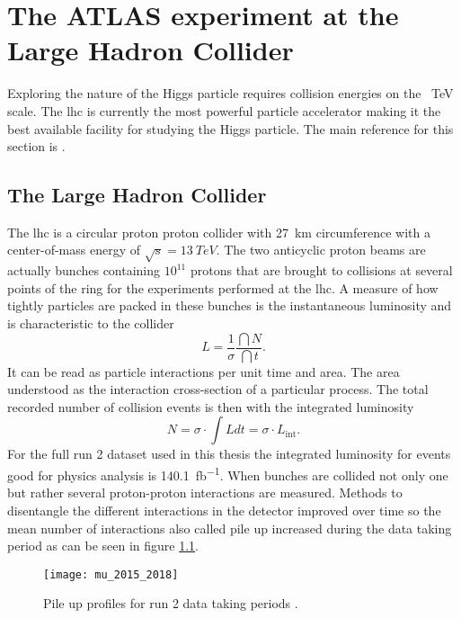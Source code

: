 \chapter{The ATLAS experiment at the Large Hadron Collider}\label{sec:atlas}
Exploring the nature of the Higgs particle requires collision energies on the \qty[]{}{TeV} scale. The \ac{lhc} is currently the most powerful particle accelerator making it the best available facility for studying the Higgs particle. The main reference for this section is \citep{aad2008atlas}.

\section{The Large Hadron Collider}
The \ac{lhc} is a circular proton proton collider with \qty[]{27}{km} circumference with a center-of-mass energy of $\sqrt{s}=\qty[]{13}{TeV}$. The two anticyclic proton beams are actually bunches containing $10^{11}$ protons that are brought to collisions at several points of the ring for the experiments performed at the \ac{lhc}. A measure of how tightly particles are packed in these bunches is the instantaneous luminosity and is characteristic to the collider
\begin{equation}
    L=\frac{1}{\sigma}\frac{\dint{N}}{\dint{t}}.
\end{equation}
It can be read as particle interactions per unit time and area. The area understood as the interaction cross-section of a particular process. The total recorded number of collision events is then with the integrated luminosity 
\begin{equation}
    N=\sigma\cdot\int L dt=\sigma\cdot L_\mathrm{int}.
\end{equation}
For the full run 2 dataset used in this thesis the integrated luminosity for events good for physics analysis is \qty[]{140.1}{fb^{-1}}\citep{DAPR-2021-01}. When bunches are collided not only one but rather several proton-proton interactions are measured. Methods to disentangle the different interactions in the detector improved over time so the mean number of interactions also called pile up increased during the data taking period as can be seen in figure \ref{fig:pileup}.
\begin{figure}
    \centering
    \texttt{[image: mu\_2015\_2018]}
        \caption[]{Pile up profiles for run 2 data taking periods \citep{pileup}.}
    \label{fig:pileup}    
\end{figure}


